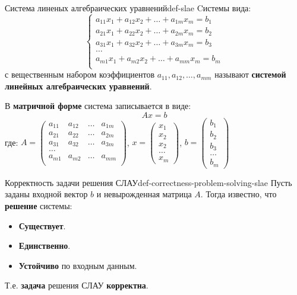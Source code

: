 \documentclass[14pt]{extarticle}
\begin{document}
    \begin{definition}{Система линеных алгебраических уравнений}{def-slae}
        Cистемы вида:
        $$\begin{cases} 
            a_{11}x_{1} + a_{12}x_{2} + \ldots + a_{1m}x_m = b_{1} \\
            a_{21}x_{1} + a_{22}x_{2} + \ldots + a_{2m}x_m = b_{2} \\
            a_{31}x_{1} + a_{32}x_{2} + \ldots + a_{3m}x_m = b_{3} \\
            \ldots \\
            a_{m1}x_{1} + a_{m2}x_{2} + \ldots + a_{mm}x_m = b_{m} \\
        \end{cases}$$
        с вещественным набором коэффициентов $a_{11}, a_{12}, \ldots, a_{mm}$ называют \textbf{системой линейных алгебраических уравнений}.

        \vspace{\baselineskip}

        В \textbf{матричной форме} система записывается в виде:
        $$Ax = b$$
        где: $A=
        \begin{pmatrix} 
            a_{11} & a_{12} & \ldots & a_{1m} \\ 
            a_{21} & a_{22} & \ldots & a_{2m} \\ 
            a_{31} & a_{32} & \ldots & a_{3m} \\ 
            \ldots \\
            a_{m1} & a_{m2} & \ldots & a_{mm} \\ 
        \end{pmatrix}$, 
        $x = \begin{pmatrix} x_{1} \\ x_{2} \\ x_{2} \\ \ldots \\ x_{m}\end{pmatrix}$,
        $b = \begin{pmatrix} b_{1} \\ b_{2} \\ b_{3} \\ \ldots \\ b_{m}\end{pmatrix}$
    \end{definition}

    \begin{definition}{Корректность задачи решения СЛАУ}{def-correctness-problem-solving-slae}
        Пусть заданы входной вектор $b$ и невырожденная матрица $A$. Тогда известно, что \textbf{решение} системы: 
        \begin{itemize}
            \item \textbf{Существует}.
            \item \textbf{Единственно}.
            \item \textbf{Устойчиво} по входным данным.
        \end{itemize}
        Т.е. \textbf{задача} решения СЛАУ \textbf{корректна}.
    \end{definition}
\end{document}
